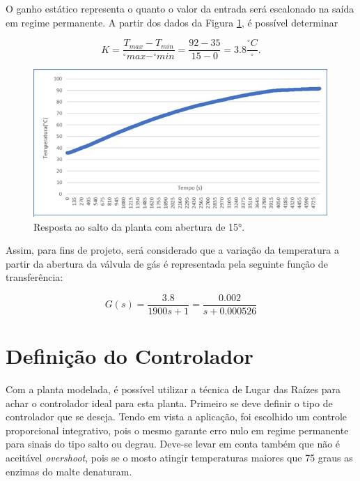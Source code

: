O ganho estático representa o quanto o valor da entrada será escalonado na saída em regime permanente. A partir dos dados da Figura \ref{Salto02}, é possível determinar

\begin{equation}
	\label{eq:8}
	K=\frac{T_{max} - T_{min}}{^{\circ} max  - ^{\circ}min}  = \frac{92-35}{15-0} = 3.8   \frac{^{\circ}C}{^{\circ}}.
\end{equation}

\begin{figure}[htb]
	\caption{\label{Salto02}Resposta ao salto da planta com abertura de 15°.}
	\begin{center}
	    \includegraphics[width=0.9\linewidth]{./img/Salto02.jpg}
	\end{center}
\end{figure}

Assim, para fins de projeto, será considerado que a variação da temperatura a partir da abertura da válvula de gás é representada pela seguinte função de transferência:

\begin{equation}
	\label{eq:9}
	G(s)=\frac{3.8}{1900s+1} = \frac{0.002}{s+0.000526} 
\end{equation}

		\section{Definição do Controlador}
Com a planta modelada, é possível utilizar a técnica de Lugar das Raízes para achar o controlador ideal para esta planta. Primeiro se deve definir o tipo de controlador que se deseja. Tendo em vista a aplicação, foi escolhido um controle proporcional integrativo, pois o mesmo garante erro nulo em regime permanente para sinais do tipo salto ou degrau. Deve-se levar em conta também que não é aceitável \textit{overshoot}, pois se o mosto atingir temperaturas maiores que 75 graus as enzimas do malte denaturam.

